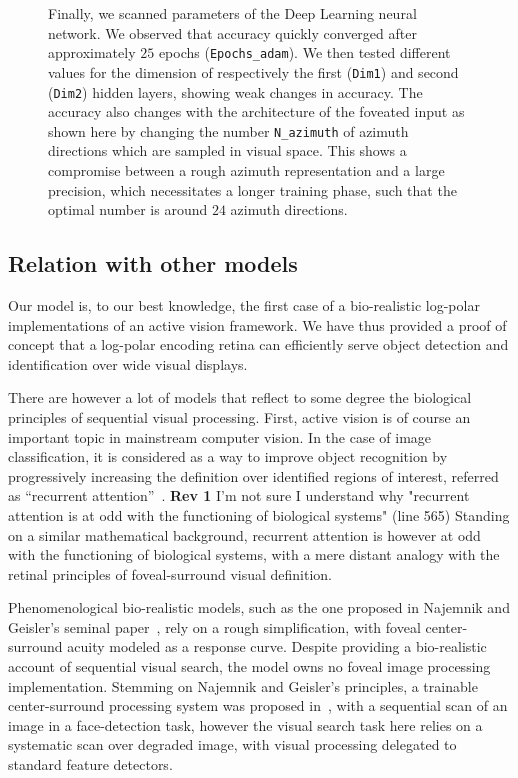 \begin{figure}[t!]
{\B Finally, we scanned parameters of the Deep Learning neural network. We observed that accuracy quickly converged after approximately $25$ epochs (\texttt{Epochs\_adam}). We then tested different values for the dimension of respectively the first (\texttt{Dim1}) and second (\texttt{Dim2}) hidden layers, showing weak changes in accuracy. %
\C
The accuracy also changes with the architecture of the foveated input as shown here by changing the number \texttt{N\_azimuth} of azimuth directions which are sampled in visual space. This shows a compromise between a rough azimuth representation and a large precision, which necessitates a longer training phase, such that the optimal number is around $24$ azimuth directions. %
\label{fig:params}}%
\end{figure}%


\subsection*{Relation with other models}

{\color{magenta} Our model is, to our best knowledge, the first case of a bio-realistic log-polar implementations of an active vision framework.} We have thus provided a proof of concept that a log-polar encoding retina can efficiently serve object detection and identification over wide visual displays.

There are however a lot of models that reflect to some degree the biological principles of sequential visual processing.
First, active vision is of course an important topic in mainstream computer vision. In the case of image classification, it is considered as a way to improve object recognition by progressively increasing the definition over identified regions of interest, referred as ``recurrent attention''~\cite{mnih2014recurrent,fu2017look}.
{\color{magenta} \textbf{Rev 1} I'm not sure I understand why "recurrent attention is at odd with the functioning of biological systems" (line 565)}
Standing on a similar mathematical background, recurrent attention is however at odd with the functioning of biological systems, with a mere distant analogy with the retinal principles of foveal-surround visual definition.

Phenomenological bio-realistic models, such as the one proposed in Najemnik and Geisler's seminal paper~\cite{Najemnik05}, rely on a rough simplification, with foveal center-surround acuity modeled as a response curve. Despite providing a bio-realistic account of sequential visual search, the model owns no foveal image processing implementation. Stemming on Najemnik and Geisler's principles, a trainable center-surround processing system was proposed in~\cite{Butko2010infomax}, with a sequential scan of an image in a face-detection task, however the visual search task here relies  on a systematic scan over degraded image, with visual processing delegated to standard feature detectors.


